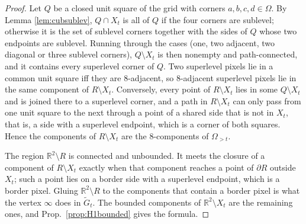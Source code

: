 \documentclass[11pt]{article}
\theoremstyle{persdef}
\newcommand{\R}{\mathbb{R}}
\newcommand{\X}{X}
\newcommand{\sublevG}[2]{#1_{> #2}}
\newcommand{\bnd}{\partial}
\begin{document}
\begin{proof}
Let $Q$ be a closed unit square of the grid with corners $a,b,c,d\in\Omega$. By Lemma \ref{lem:cubsublev}, $Q\cap\X_t$ is all of $Q$ if the four corners are sublevel; otherwise it is the set of sublevel corners together with the sides of $Q$ whose two endpoints are sublevel. Running through the cases (one, two adjacent, two diagonal or three sublevel corners), $Q\setminus\X_t$ is then nonempty and path-connected, and it contains every superlevel corner of $Q$. Two superlevel pixels lie in a common unit square iff they are $8$-adjacent, so $8$-adjacent superlevel pixels lie in the same component of $R\setminus\X_t$. Conversely, every point of $R\setminus\X_t$ lies in some $Q\setminus\X_t$ and is joined there to a superlevel corner, and a path in $R\setminus\X_t$ can only pass from one unit square to the next through a point of a shared side that is not in $\X_t$, that is, a side with a superlevel endpoint, which is a corner of both squares. Hence the components of $R\setminus\X_t$ are the $8$-components of $\sublevG{\Omega}{t}$.

The region $\R^2\setminus R$ is connected and unbounded. It meets the closure of a component of $R\setminus\X_t$ exactly when that component reaches a point of $\bnd R$ outside $\X_t$; such a point lies on a border side with a superlevel endpoint, which is a border pixel. Gluing $\R^2\setminus R$ to the components that contain a border pixel is what the vertex $\infty$ does in $\widetilde{G}_t$. The bounded components of $\R^2\setminus\X_t$ are the remaining ones, and Prop.\ \ref{prop:H1bounded} gives the formula.
\end{proof}
\end{document}
